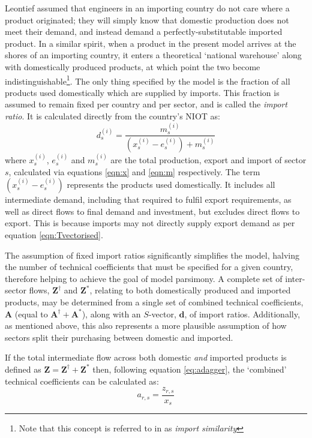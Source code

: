 \documentclass[a4paper]{article}
\begin{document}
Leontief assumed that engineers in an importing country do not care where a product originated; they will simply know that domestic production does not meet their demand, and instead demand a perfectly-substitutable imported product.
In a similar spirit, when a product in the present model arrives at the shores of an importing country, it enters a theoretical `national warehouse' along with domestically produced products, at which point the two become indistinguishable\footnote{Note that this concept is referred to in \textcite{miller_input-output_1985} as \textit{import similarity}}.
The only thing specified by the model is the fraction of all products used domestically which are supplied by imports. This fraction is assumed to remain fixed per country and per sector, and is called the \textit{import ratio}. It is calculated directly from the country's NIOT as:
\begin{equation}\label{eqn:importratio}
d_s^{(i)} = \frac{m_s^{(i)}}{(x_s^{(i)} - e_s^{(i)} ) + m_s^{(i)}}
\end{equation}
where $x_s^{(i)}$, $e_s^{(i)}$ and $m_s^{(i)}$ are the total production, export and import of sector $s$, calculated via equations \eqref{eqn:x} and \eqref{eqn:m} respectively.
The term $(x_s^{(i)} - e_s^{(i)} )$ represents the products used domestically.
It includes all intermediate demand, including that required to fulfil export requirements, as well as direct flows to final demand and investment, but excludes direct flows to export.
This is because imports may not directly supply export demand as per equation \eqref{eqn:Tvectorised}.

The assumption of fixed import ratios significantly simplifies the model, halving the number of technical coefficients that must be specified for a given country, therefore helping to achieve the goal of model parsimony.
A complete set of inter-sector flows, $\boldsymbol{Z}^{\dagger}$ and $\boldsymbol{Z}^{*}$, relating to both domestically produced and imported products, may be determined from a single set of combined technical coefficients, $\boldsymbol{A}$ (equal to $\boldsymbol{A}^{\dagger} + \boldsymbol{A}^{*}$), along with an $S$-vector, $\boldsymbol{d}$, of import ratios.
Additionally, as mentioned above, this also represents a more plausible assumption of how sectors split their purchasing between domestic and imported.

If the total intermediate flow across both domestic \textit{and} imported products is defined as $\boldsymbol{Z} = \boldsymbol{Z}^{\dagger} + \boldsymbol{Z}^{*}$ then, following equation \eqref{eq:adagger}, the `combined' technical coefficients can be calculated as:
\begin{equation}\label{eqn:a_combined}
a_{r,s} = \frac{z_{r,s}}{x_s}
\end{equation}
\end{document}
